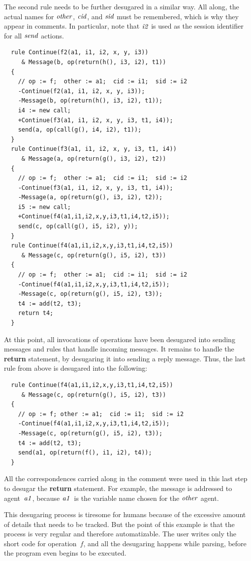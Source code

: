 \documentclass[a4paper,12pt,oneside,fleqn]{book} %
\begin{document}
\begin{example}
The second rule needs to be further desugared in a similar way. All along,
the actual names for $\it other$, $\it cid$, and $\it sid$ must be
remembered, which is why they appear in comments. In particular, note that
$\it i2$ is used as the session identifier for all $\it send$ actions.
\begin{verbatim}
  rule Continue(f2(a1, i1, i2, x, y, i3))
     & Message(b, op(return(h(), i3, i2), t1))
  {
    // op := f;  other := a1;  cid := i1;  sid := i2
    -Continue(f2(a1, i1, i2, x, y, i3));
    -Message(b, op(return(h(), i3, i2), t1));
    i4 := new call;
    +Continue(f3(a1, i1, i2, x, y, i3, t1, i4));
    send(a, op(call(g(), i4, i2), t1));
  }
  rule Continue(f3(a1, i1, i2, x, y, i3, t1, i4))
     & Message(a, op(return(g(), i3, i2), t2))
  {
    // op := f;  other := a1;  cid := i1;  sid := i2
    -Continue(f3(a1, i1, i2, x, y, i3, t1, i4));
    -Message(a, op(return(g(), i3, i2), t2));
    i5 := new call;
    +Continue(f4(a1,i1,i2,x,y,i3,t1,i4,t2,i5));
    send(c, op(call(g(), i5, i2), y));
  }
  rule Continue(f4(a1,i1,i2,x,y,i3,t1,i4,t2,i5))
     & Message(c, op(return(g(), i5, i2), t3))
  {
    // op := f;  other := a1;  cid := i1;  sid := i2
    -Continue(f4(a1,i1,i2,x,y,i3,t1,i4,t2,i5));
    -Message(c, op(return(g(), i5, i2), t3));
    t4 := add(t2, t3);
    return t4;
  }
\end{verbatim}
At this point, all invocations of operations have been desugared into
sending messages and rules that handle incoming messages. It remains to
handle the {\bf return} statement, by desugaring it into sending a reply
message. Thus, the last rule from above is desugared into the following:
\begin{verbatim}
  rule Continue(f4(a1,i1,i2,x,y,i3,t1,i4,t2,i5))
     & Message(c, op(return(g(), i5, i2), t3))
  {
    // op := f; other := a1;  cid := i1;  sid := i2
    -Continue(f4(a1,i1,i2,x,y,i3,t1,i4,t2,i5));
    -Message(c, op(return(g(), i5, i2), t3));
    t4 := add(t2, t3);
    send(a1, op(return(f(), i1, i2), t4));
  }
\end{verbatim}
All the correspondences carried along in the comment were used in this last
step to desugar the {\bf return} statement. For example, the message is
addressed to agent~$\it a1$, because $\it a1$~is the variable name chosen
for the $\it other$ agent.

This desugaring process is tiresome for humans because of the excessive
amount of details that needs to be tracked. But the point of this example
is that the process is very regular and therefore automatizable. The user
writes only the short code for operation~$f$, and all the desugaring
happens while parsing, before the program even begins to be executed.
\end{example}
\end{document}
